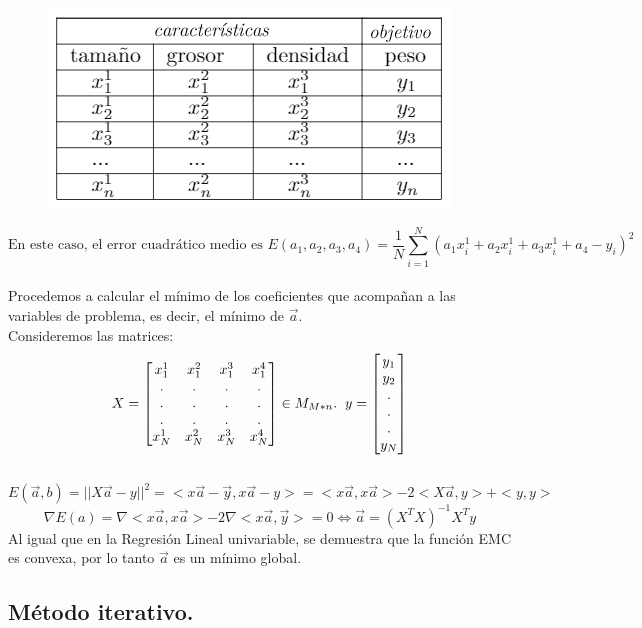 \documentclass[a4paper,11pt]{article}
\begin{document}
\begin{figure}[H]
\centering
\includegraphics[scale=0.7]{Annotation 2020-03-23 133547}
\end{figure}
 \[\text{En este caso, el error cuadrático medio es } E(a_{1},a_{2},a_{3},a_{4})=\frac{1}{N}\sum_{i=1}^{N}(a_{1}x_i^1+a_{2}x_i^1+a_{3}x_i^1+a_{4}-y_{i})^2
\]
\\Procedemos a calcular el mínimo de los coeficientes que acompañan a las variables de problema, es decir, el mínimo de $\vec{a}$.\\

\noindent
Consideremos las matrices:
\[X= \begin{bmatrix}
    x_{1}^1 & x_{1}^2 & x_{1}^3 & x_{1}^4  \\
    .&.&.&.\\
    .&.&.&.\\
    .&.&.&.\\
    x_{N}^1 & x_{N}^2 & x_{N}^3 & x_{N}^4 
\end{bmatrix} \in M_{M*n}. \hspace{0.20cm} y=\begin{bmatrix}y_{1}\\y_{2}\\.\\.\\.\\y_{N}\end{bmatrix}\] \\ \[E(\vec{a},b)=||X\vec{a}-y||^2 = <x\vec{a}-\vec{y},x\vec{a}-y>=<x\vec{a},x\vec{a}>-2<X\vec{a},y>+<y,y>\]
\[\nabla E(a)=\nabla<x\vec{a},x\vec{a}>-2\nabla<x\vec{a},\vec{y}>=0\Leftrightarrow \boxed{ \vec{a}=(X^T X)^{-1} X^T y}\]
Al igual que en la Regresión Lineal univariable, se demuestra que la función EMC es convexa, por lo tanto $\vec{a}$ es un mínimo global.


\subsection{Método iterativo.}
\end{document}
